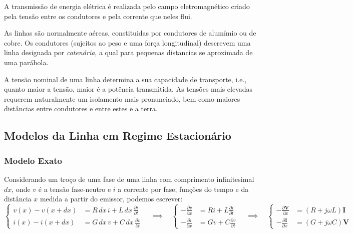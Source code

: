 \setcounter{figure}{29}


A transmissão de energia elétrica é realizada pelo campo eletromagnético criado pela tensão entre os condutores e pela corrente que neles flui.

As linhas são normalmente aéreas, constituidas por condutores de alumímio ou de cobre. Os condutores (sujeitos ao peso e uma força longitudinal) descrevem uma linha designada por \textit{catenária}, a qual para pequenas distancias se aproximada de uma parábola.

A tensão nominal de uma linha determina a sua capacidade de transporte, i.e., quanto maior a tensão, maior é a potência transmitida. As tensões mais elevadas requerem naturalmente um isolamento mais pronunciado, bem como maiores distâncias entre condutores e entre estes e a terra. 

\subsection{Modelos da Linha em Regime Estacionário}

\subsubsection{Modelo Exato}

Considerando um troço de uma fase de uma linha com comprimento infinitesimal $dx$, onde $v$ é a tensão fase-neutro e $i$ a corrente por fase, funções do tempo e da distância $x$ medida a partir do emissor, podemos escrever:
$$
    \left\{
    \begin{aligned}
        v(x) - v(x+dx) &= R\, dx\, i + L\, dx\, \frac{\partial i}{\partial t} \\[8pt]
        i(x) - i(x+dx) &= G\, dx\, v + C\, dx\, \frac{\partial v}{\partial t}
    \end{aligned}\right.
    \quad\implies\quad
    \left\{
    \begin{aligned}
        -\frac{\partial v}{\partial x} &= Ri + L\frac{\partial i}{\partial t} \\[8pt]
        -\frac{\partial i}{\partial x} &= Gv + C\frac{\partial v}{\partial t}
    \end{aligned}\right.
    \quad\implies\quad
    \left\{
    \begin{aligned}
        -\frac{\partial \mathbf{V}}{\partial x} &= (R + j\omega L) \mathbf{I} \\[8pt]
        -\frac{\partial \mathbf{I}}{\partial x} &= (G + j\omega C) \mathbf{V}
    \end{aligned}\right.
$$

